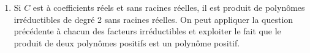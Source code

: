 \begin{enumerate}
\item Si $C$ est {\`a} coefficients r{\'e}els et sans racines r{\'e}elles, il est produit de polyn{\^o}mes irr{\'e}ductibles de degr{\'e} 2 sans racines r{\'e}elles. On peut appliquer la question pr{\'e}c{\'e}dente {\`a} chacun des facteurs irr{\'e}ductibles et exploiter le fait que le produit de deux polynômes positifs est un polynôme positif.
\end{enumerate}
